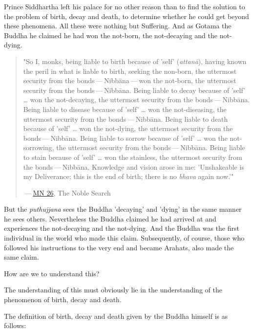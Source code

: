 Prince Siddhartha left his palace for no other reason than to find the solution to the problem of birth, decay and death, to determine whether he could get beyond these phenomena. All these were nothing but Suffering. And as Gotama the Buddha he claimed he had won the not-born, the not-decaying and the not-dying.

\begin{quote}
"So I, monks, being liable to birth because of 'self' (\emph{attanā}), having known the peril in what is liable to birth, seeking the non-born, the uttermost security from the bonds --- Nibbāna --- won the not-born, the uttermost security from the bonds --- Nibbāna. Being liable to decay because of 'self' \ldots\hspace{0pt} won the not-decaying, the uttermost security from the bonds --- Nibbāna. Being liable to disease because of 'self' \ldots\hspace{0pt} won the not-diseasing, the uttermost security from the bonds --- Nibbāna. Being liable to death because of 'self' \ldots\hspace{0pt} won the not-dying, the uttermost security from the bonds --- Nibbāna. Being liable to sorrow because of 'self' \ldots\hspace{0pt} won the not-sorrowing, the uttermost security from the bonds --- Nibbāna. Being liable to stain because of 'self' \ldots\hspace{0pt} won the stainless, the uttermost security from the bonds --- Nibbāna. Knowledge and vision arose in me: 'Unshakeable is my Deliverance; this is the end of birth; there is no \emph{bhava} again now.'"

 --- \href{https://suttacentral.net/mn26/en/bodhi}{MN 26}, The Noble Search
\end{quote}

But the \emph{puthujjana} sees the Buddha 'decaying' and 'dying' in the same manner he sees others. Nevertheless the Buddha claimed he had arrived at and experiences the not-decaying and the not-dying. And the Buddha was the first individual in the world who made this claim. Subsequently, of course, those who followed his instructions to the very end and became Arahats, also made the same claim.

How are we to understand this?

The understanding of this must obviously lie in the understanding of the phenomenon of birth, decay and death.

The definition of birth, decay and death given by the Buddha himself is as follows:

